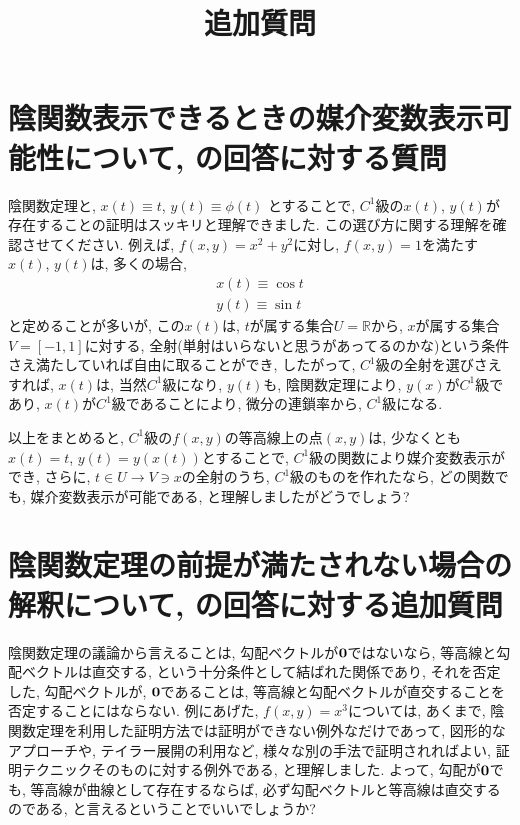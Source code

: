 \documentclass{jsarticle}
\title{追加質問}
\newcommand*{\mbold}[1]{\mbox{\boldmath $#1$}}
\begin{document}
\maketitle
\section{陰関数表示できるときの媒介変数表示可能性について, の回答に対する質問}
陰関数定理と, $x(t) \equiv t$, $y(t) \equiv \phi(t)$ とすることで, $C^1$級の$x(t)$, $y(t)$が存在することの証明はスッキリと理解できました. 
この選び方に関する理解を確認させてください. 
例えば, $f(x, y) = x^2 + y^2$に対し, $f(x, y) = 1$を満たす$x(t)$, $y(t)$は, 多くの場合, 
\begin{subequations}
  \begin{eqnarray}
    x(t) \equiv \cos t \\
    y(t) \equiv \sin t
  \end{eqnarray}
\end{subequations}
と定めることが多いが, この$x(t)$は, $t$が属する集合$U = \mathbb{R}$から, $x$が属する集合$V = [-1, 1]$に対する, 
全射(単射はいらないと思うがあってるのかな)という条件さえ満たしていれば自由に取ることができ, 
したがって, $C^1$級の全射を選びさえすれば, $x(t)$は, 当然$C^1$級になり, 
$y(t)$も, 陰関数定理により, $y(x)$が$C^1$級であり, $x(t)$が$C^1$級であることにより, 微分の連鎖率から, $C^1$級になる. 

以上をまとめると, 
$C^1$級の$f(x, y)$の等高線上の点$(x, y)$は, 少なくとも$x(t) = t$, $y(t) = y(x(t))$とすることで, $C^1$級の関数により媒介変数表示ができ, 
さらに, $t \in U \to V \ni x$の全射のうち, $C^1$級のものを作れたなら, どの関数でも, 媒介変数表示が可能である, と理解しましたがどうでしょう?

\section{陰関数定理の前提が満たされない場合の解釈について, の回答に対する追加質問}
陰関数定理の議論から言えることは, 
勾配ベクトルが$\mbold{0}$ではないなら, 等高線と勾配ベクトルは直交する, という十分条件として結ばれた関係であり, 
それを否定した, 勾配ベクトルが, $\mbold{0}$であることは, 等高線と勾配ベクトルが直交することを否定することにはならない. 
例にあげた, $f(x, y) = x^3$については, あくまで, 陰関数定理を利用した証明方法では証明ができない例外なだけであって, 
図形的なアプローチや, テイラー展開の利用など, 様々な別の手法で証明されればよい, 証明テクニックそのものに対する例外である, と理解しました. 
よって, 勾配が$\mbold{0}$でも, 等高線が曲線として存在するならば, 必ず勾配ベクトルと等高線は直交するのである, と言えるということでいいでしょうか?
\end{document}
